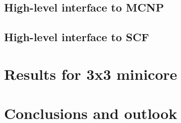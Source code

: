 \documentclass[t]{beamer}
\begin{document}
\subsection{High-level interface to MCNP}


\subsection{High-level interface to SCF}


%

\section{Results for 3x3 minicore}


\section{Conclusions and outlook}

\end{document}
